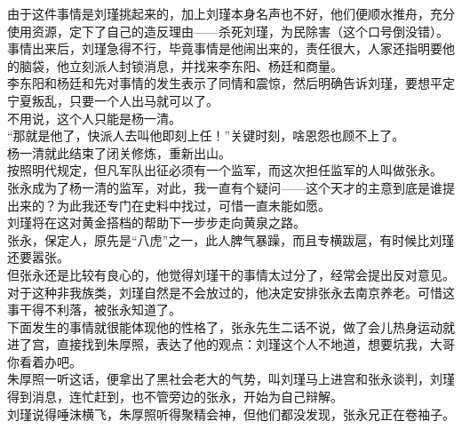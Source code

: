 \begin{multicols}{\theparacolNo}
由于这件事情是刘瑾挑起来的，加上刘瑾本身名声也不好，他们便顺水推舟，充分使用资源，定下了自己的造反理由——杀死刘瑾，为民除害（这个口号倒没错）。\\

事情出来后，刘瑾急得不行，毕竟事情是他闹出来的，责任很大，人家还指明要他的脑袋，他立刻派人封锁消息，并找来李东阳、杨廷和商量。\\

李东阳和杨廷和先对事情的发生表示了同情和震惊，然后明确告诉刘瑾，要想平定宁夏叛乱，只要一个人出马就可以了。\\

不用说，这个人只能是杨一清。\\

“那就是他了，快派人去叫他即刻上任！”关键时刻，啥恩怨也顾不上了。\\

杨一清就此结束了闭关修炼，重新出山。\\

按照明代规定，但凡军队出征必须有一个监军，而这次担任监军的人叫做张永。\\

张永成为了杨一清的监军，对此，我一直有个疑问——这个天才的主意到底是谁提出来的？为此我还专门在史料中找过，可惜一直未能如愿。\\

刘瑾将在这对黄金搭档的帮助下一步步走向黄泉之路。\\

张永，保定人，原先是“八虎”之一，此人脾气暴躁，而且专横跋扈，有时候比刘瑾还要嚣张。\\

但张永还是比较有良心的，他觉得刘瑾干的事情太过分了，经常会提出反对意见。\\

对于这种非我族类，刘瑾自然是不会放过的，他决定安排张永去南京养老。可惜这事干得不利落，被张永知道了。\\

下面发生的事情就很能体现他的性格了，张永先生二话不说，做了会儿热身运动就进了宫，直接找到朱厚照，表达了他的观点：刘瑾这个人不地道，想要坑我，大哥你看着办吧。\\

朱厚照一听这话，便拿出了黑社会老大的气势，叫刘瑾马上进宫和张永谈判，刘瑾得到消息，连忙赶到，也不管旁边的张永，开始为自己辩解。\\

刘瑾说得唾沫横飞，朱厚照听得聚精会神，但他们都没发现，张永兄正在卷袖子。\\


\end{multicols}
